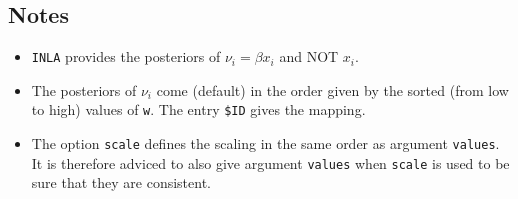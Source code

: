 \documentclass[a4paper,11pt]{article}
\begin{document}
\subsection*{Notes}

\begin{itemize}
\item \texttt{INLA} provides the posteriors of $\nu_i=\beta x_i$ and NOT $x_i$.
\item The posteriors of $\nu_i$ come (default) in the order given by the sorted
(from low to high) values of \texttt{w}. The entry \verb|$ID|
gives the mapping.
\item The option \verb|scale| defines the scaling in the same order as
argument \verb|values|. It is therefore adviced to also give
argument \verb|values| when \verb|scale| is used to be sure that
they are consistent.
\end{itemize}
\end{document}
